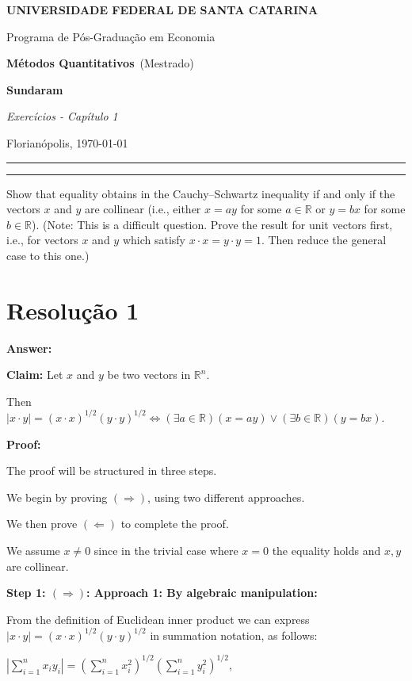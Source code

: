 \documentclass[12pt]{article}
\newcommand{\instituicao}{UNIVERSIDADE FEDERAL DE SANTA CATARINA}
\newcommand{\departamento}{Programa de Pós-Graduação em Economia}
\newcommand{\curso}{Mestrado}
\newcommand{\disciplina}{Métodos Quantitativos}
\newcommand{\titulo}{Sundaram}
\newcommand{\subtitulo}{Exercícios - Capítulo 1}
\newcommand{\autor}{}
\newcommand{\local}{Florianópolis}
\newcommand{\dataentrega}{\today}
\newcommand{\imprimirtitulo}{
\noindent

\begin{center}
  {\Large\bfseries\MakeUppercase{\instituicao}\par}
  \vspace{0.2em}
  {\large \departamento\par}
  \vspace{0.2em}
  {\normalsize\textbf{\disciplina}\ (\curso)\par}
  \vspace{1.4em}
  {\LARGE\bfseries \titulo\par}
  \vspace{0.25em}
  {\large\itshape \subtitulo\par}
  \vspace{1.5em}
\end{center}

\noindent
\begin{minipage}{0.48\textwidth}
  \raggedright\normalsize \autor
\end{minipage}\hfill
\begin{minipage}{0.48\textwidth}
  \raggedleft\normalsize \local, \dataentrega
\end{minipage}

\vspace{1.0em}
\hrule
}
\begin{document}
\imprimirtitulo


\renewcommand{\contentsname}{Sumário}
\tableofcontents
\vspace{1.5em}
\hrule


Show that equality obtains in the Cauchy--Schwartz inequality if and only if the vectors $x$ and $y$ are collinear (i.e., either $x = ay$ for some $a \in \mathbb{R}$ or $y = bx$ for some $b \in \mathbb{R}$). (Note: This is a difficult question. Prove the result for unit vectors first, i.e., for vectors $x$ and $y$ which satisfy $x \cdot x = y \cdot y = 1$. Then reduce the general case to this one.)

\newpage

\section{Resolução 1}
  
  \textbf{Answer:} 

  \textbf{Claim:} 
  Let $x$ and $y$ be two vectors in $\mathbb{R}^n$. 

  Then $|x \cdot y| = (x \cdot x)^{1/2}(y \cdot y)^{1/2} \Leftrightarrow (\exists a \in \mathbb{R})(x = ay) \lor (\exists b \in \mathbb{R})(y = bx).$

  \textbf{Proof:}

  The proof will be structured in three steps.

  We begin by proving $(\Rightarrow)$, using two different approaches. 
  
  We then prove $(\Leftarrow)$ to complete the proof.

  We assume $x \ne 0$ since in the trivial case where $x=0$ the equality holds and $x,y$ are collinear.

  \textbf{Step 1: $(\Rightarrow)$: Approach 1: By algebraic manipulation:}

  From the definition of Euclidean inner product we can express $|x \cdot y| = (x \cdot x)^{1/2}(y \cdot y)^{1/2}$ in summation notation, as follows:
  
  $\left| \sum_{i=1}^n x_i y_i \right|=\left( \sum_{i=1}^n x_i^2 \right)^{1/2}\left( \sum_{i=1}^n y_i^2 \right)^{1/2}$,
\end{document}
